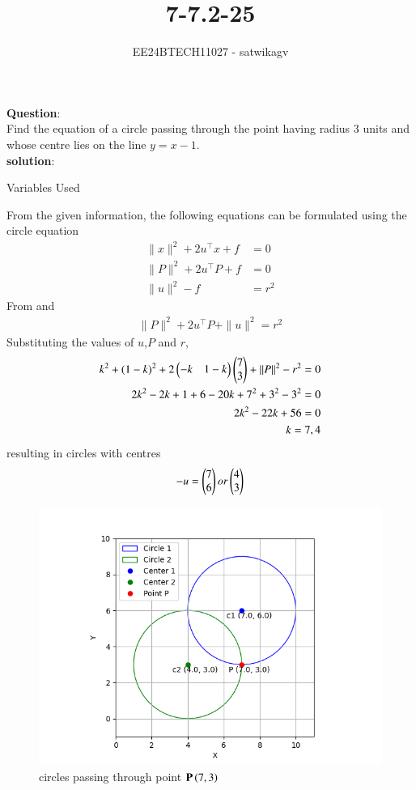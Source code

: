 \documentclass[journal]{IEEEtran}
\begin{document}

\vspace{3cm}

\title{7-7.2-25}
\author{EE24BTECH11027 - satwikagv}
{\let\newpage\relax\maketitle}

\renewcommand{\thefigure}{\theenumi}
\renewcommand{\thetable}{\theenumi}
\setlength{\intextsep}{10pt} %


\renewcommand{\thetable}{\theenumi}
\textbf{Question}:\\
Find the equation of a circle passing through the point  having radius 3 units and whose centre lies on the line $y=x-1$.\\
\textbf{solution}:
\begin{table}[h!]    
  \centering
  
  \caption{Variables Used}
\end{table}
From the given information, the following equations can be formulated using the circle equation 
\begin{align}
\|x\|^2 + 2u^\top x + f &= 0\\
\|P\|^2 + 2u^\top P + f &= 0\\
\|u\|^2 - f &= r^2
\end{align}
From  and 
\begin{align}
\|P\|^2 + 2u^\top P + \|u\|^2 = r^2 	
\end{align}
Substituting the values of $u$,$P$ and $r$,
\begin{align}
k^2+(1-k)^2+2\begin{pmatrix}-k&1-k\end{pmatrix}\begin{pmatrix}7\\3\end{pmatrix}+\|P\|^2-r^2 = 0\\
2k^2-2k+1+6-20k+7^2+3^2-3^2=0\\
2k^2-22k+56=0\\
k=7,4
\end{align}
resulting in circles with centres 
\begin{align}
-u=\begin{pmatrix}7\\6\end{pmatrix} or \begin{pmatrix}4\\3\end{pmatrix}	
\end{align}
\begin{figure}[h!]
   \centering
   \includegraphics[width=0.7\linewidth]{figs/circle_plot.png}
   \caption{circles passing through point $\mathbf{P}\left(7,3\right)$}
\end{figure}
\end{document}
